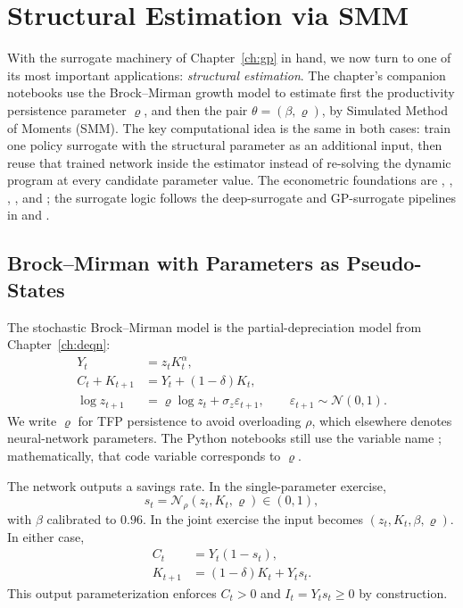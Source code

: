\documentclass[11pt,a4paper]{report}
\begin{document}
\chapter{Structural Estimation via SMM}
\label{ch:estimation}

With the surrogate machinery of Chapter~\ref{ch:gp} in hand, we now turn to one of its most important applications: \emph{structural estimation}.  The chapter's companion notebooks use the Brock--Mirman growth model to estimate first the productivity persistence parameter $\varrho$, and then the pair $\theta=(\beta,\varrho)$, by Simulated Method of Moments (SMM).  The key computational idea is the same in both cases: train one policy surrogate with the structural parameter as an additional input, then reuse that trained network inside the estimator instead of re-solving the dynamic program at every candidate parameter value.  The econometric foundations are \citet{mcfadden1989method}, \citet{pakes1989simulation}, \citet{lee1991simulation}, \citet{duffie1993simulated}, and \citet{gourieroux1993indirect}; the surrogate logic follows the deep-surrogate and GP-surrogate pipelines in \citet{chen2025Deep} and \citet{SCHEIDEGGER201968}.

\section{Brock--Mirman with Parameters as Pseudo-States}

The stochastic Brock--Mirman model is the partial-depreciation model from Chapter~\ref{ch:deqn}:
\begin{align}
Y_t &= z_t K_t^\alpha, \\
C_t + K_{t+1} &= Y_t + (1-\delta)K_t, \\
\log z_{t+1} &= \varrho \log z_t + \sigma_z \varepsilon_{t+1}, \qquad
\varepsilon_{t+1}\sim\mathcal{N}(0,1).
\end{align}
We write $\varrho$ for TFP persistence to avoid overloading $\rho$, which elsewhere denotes neural-network parameters.  The Python notebooks still use the variable name ; mathematically, that code variable corresponds to $\varrho$.

The network outputs a savings rate.  In the single-parameter exercise,
\[
s_t = \mathcal{N}_{\rho}(z_t,K_t,\varrho) \in (0,1),
\]
with $\beta$ calibrated to $0.96$.  In the joint exercise the input becomes $(z_t,K_t,\beta,\varrho)$.  In either case,
\begin{align}
C_t &= Y_t(1-s_t), \\
K_{t+1} &= (1-\delta)K_t + Y_t s_t.
\end{align}
This output parameterization enforces $C_t>0$ and $I_t=Y_t s_t\geq0$ by construction.
\end{document}
